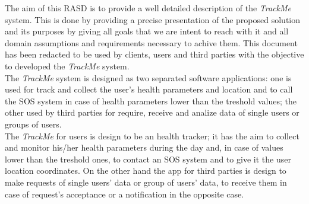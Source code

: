 The aim of this RASD is to provide a well detailed description of the \textit{TrackMe} system.
This is done by providing a precise presentation of the proposed solution and its purposes by giving all goals that we are intent to reach with it and all domain assumptions and requirements necessary to achive them.
This document has been redacted to be used by clients, users and third parties with the objective to developed the \textit{TrackMe} system.\vspace{0.5cm}\\The \textit{TrackMe} system is designed as two separated software applications: one is used for track and collect the user's health parameters and location and to call the SOS system in case of health parameters lower than the treshold values; the other used by third parties for require, receive and analize data of single users or groups of users.\\
The \textit{TrackMe} for users is design to be an health tracker; it has the aim to collect and monitor his/her health parameters during the day and, in case of values lower than the treshold ones, to contact an SOS system and to give it the user location coordinates. On the other hand the app for third parties is design to make requests of single users' data or group of users' data, to receive them in case of request's acceptance or a notification in the opposite case.